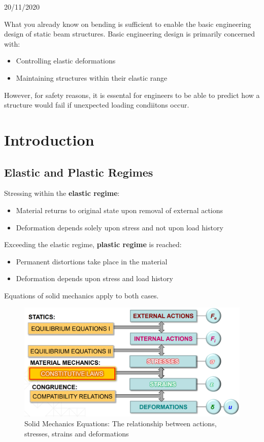 \documentclass[class=report, crop=false, 12pt,a4paper]{standalone}
\begin{document}
\begin{center}
  20/11/2020
\end{center}
What you already know on bending is sufficient to enable the basic engineering design of static beam structures. Basic engineering design is primarily concerned with:
\begin{itemize}
  \item Controlling elastic deformations
  \item Maintaining structures within their elastic range
\end{itemize}
However, for safety reasons, it is essental for engineers to be able to predict how a structure would fail if unexpected loading condiitons occur. 
\section{Introduction}
\subsection{Elastic and Plastic Regimes}
Stressing within the \textbf{elastic regime}:
\begin{itemize}
  \item Material returns to original state upon removal of external actions
  \item Deformation depends solely upon stress and not upon load history
\end{itemize}
Exceeding the elastic regime, \textbf{plastic regime} is reached:
\begin{itemize}
  \item Permanent distortions take place in the material
  \item Deformation depends upon stress and load history
\end{itemize}
Equations of solid mechanics apply to both cases.
\begin{figure}[H]
  \centering
  \includegraphics[width = 0.7 \textwidth]{../img/diagram1.PNG}
  \caption{Solid Mechanics Equations: The relationship between actions, stresses, strains and deformations}
\end{figure}
\end{document}
